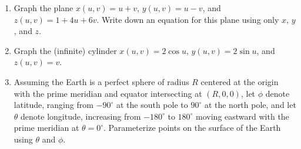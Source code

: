 \begin{enumerate}
\begin{enumerate}
\item Graph the plane $x(u,v) = u + v$, $y(u,v) = u - v$, and $z(u,v) = 1 + 4u + 6v$. Write down an equation for this plane using only $x$, $y$, and $z$.
\item Graph the (infinite) cylinder $x(u,v) = 2\cos u$, $y(u,v) = 2\sin u$, and $z(u,v) = v$.
\item Assuming the Earth is a perfect sphere of radius $R$ centered at the origin with the prime meridian and equator intersecting at $(R,0,0)$, let $\phi$ denote latitude, ranging from $-90^{\circ}$ at the south pole to $90^{\circ}$ at the north pole, and let $\theta$ denote longitude, increasing from $-180^{\circ}$ to $180^{\circ}$ moving eastward with the prime meridian at $\theta = 0^{\circ}$. Parameterize points on the surface of the Earth using $\theta$ and $\phi$.
\end{enumerate}
\end{enumerate}